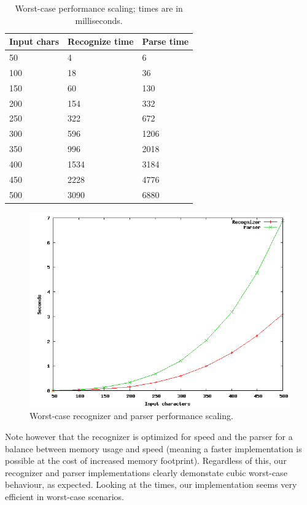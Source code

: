 \documentclass[a4paper,10pt]{article}
\begin{document}
\begin{table}[H]
\centering
\begin{tabular}{ | p{5em} | p{7em} | p{6em} | }
  \hline
  Input chars & Recognize time & Parse time \\
  \hline
  50 & 4 & 6 \\
  100 & 18 & 36 \\
  150 & 60 & 130 \\
  200 & 154 & 332 \\
  250 & 322 & 672 \\
  300 & 596 & 1206 \\
  350 & 996 & 2018 \\
  400 & 1534 & 3184 \\
  450 & 2228 & 4776 \\
  500 & 3090 & 6880 \\
  \hline
\end{tabular}
\caption{Worst-case performance scaling; times are in milliseconds.}
\end{table}

\begin{figure}[H]
\centering
\includegraphics[scale=0.5]{worst-case.png}
\caption{Worst-case recognizer and parser performance scaling.}
\end{figure}

\pagebreak
Note however that the recognizer is optimized for speed and the parser for a balance between memory usage and speed (meaning a faster implementation is possible at the cost of increased memory footprint). Regardless of this, our recognizer and parser implementations clearly demonstate cubic worst-case behaviour, as expected. Looking at the times, our implementation seems very efficient in worst-case scenarios.
\end{document}
